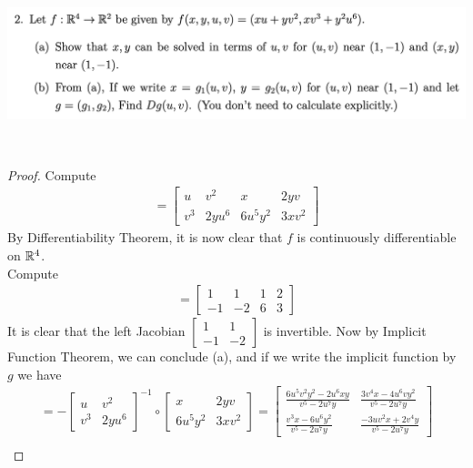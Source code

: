 \documentclass{report}
\begin{document}
\begin{question}{}{}
\includegraphics[height=5cm,width=18cm]{hw6a2}
\end{question}
\begin{proof}
Compute 
\begin{align*}
[df]= \begin{bmatrix}
  u & v^2 & x & 2yv \\
  v^3 & 2yu^6 & 6u^5y^2 & 3xv^2
\end{bmatrix}
\end{align*}
By Differentiability Theorem, it is now clear that $f$ is continuously differentiable on $\mathbb{R}^4$.\\

Compute 
\begin{align*}
[df_{(1,-1,1,-1)}]=\begin{bmatrix}
  1 & 1 & 1 & 2\\
  -1 & -2 & 6 & 3 
\end{bmatrix}
\end{align*}
It is clear that the left Jacobian $\begin{bmatrix}
  1 & 1 \\
  -1 & -2
\end{bmatrix}$ is invertible. Now by Implicit Function Theorem, we can conclude (a), and if we write the implicit function by $g$ we have    
\begin{align*}
[dg_{(u,v)}]= - \begin{bmatrix}
  u & v^2 \\
  v^3 & 2yu^6
\end{bmatrix}^{-1} \circ \begin{bmatrix}
  x & 2yv \\
  6u^5y^2 & 3xv^2 
\end{bmatrix}=\begin{bmatrix}
\frac{6u^5v^2y^2-2u^6xy}{v^5-2u^7y} & \frac{3v^4x-4u^6vy^2}{v^5-2u^7y} \\
\frac{v^3x-6u^6y^2}{v^5-2u^7y} & \frac{-3uv^2x+2v^4y}{v^5-2u^7y}
\end{bmatrix}
\end{align*}
\begin{align*}
\end{align*}
\end{proof}
\end{document}
